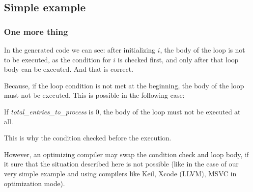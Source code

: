 \subsection{Simple example}





\subsubsection{One more thing}

In the generated code we can see: 
after initializing $i$, the body of the loop is not to be executed,
as the condition for $i$ is checked first, and only after that loop body can be executed.
And that is correct. 

Because, if the loop condition is
not met at the beginning, the body of the loop must not be executed.
This is possible in the following case:



If \emph{total\_entries\_to\_process} is 0, the body of the loop must not be executed at all.

This is why the condition checked before the execution.

However, an optimizing compiler may swap the condition check and loop body,
if it sure that the situation described here is
not possible (like in the case of our very simple example and using compilers like Keil, Xcode (LLVM), MSVC in optimization mode).
